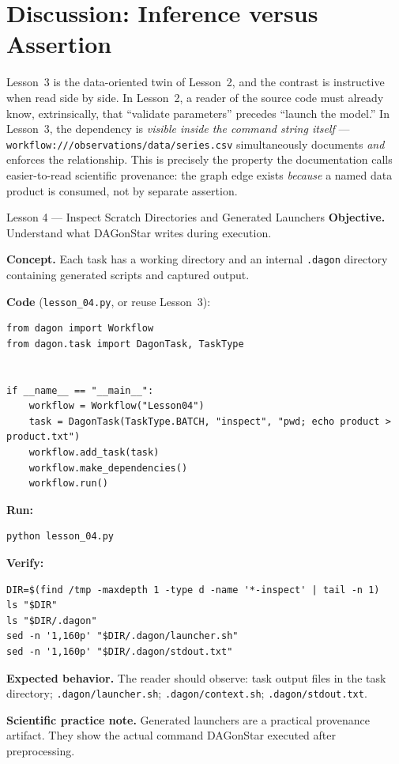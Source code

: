 \section{Discussion: Inference versus Assertion}

Lesson~3 is the data-oriented twin of Lesson~2, and the contrast is
instructive when read side by side. In Lesson~2, a reader of the source code
must already know, extrinsically, that ``validate parameters'' precedes
``launch the model.'' In Lesson~3, the dependency is \emph{visible inside the
command string itself} --- \texttt{workflow:///observations/data/series.csv}
simultaneously documents \emph{and} enforces the relationship. This is
precisely the property the documentation calls easier-to-read scientific
provenance: the graph edge exists \emph{because} a named data product is
consumed, not by separate assertion.

\begin{lessonbox}{Lesson 4 --- Inspect Scratch Directories and Generated Launchers}
\textbf{Objective.} Understand what DAGonStar writes during execution.

\textbf{Concept.} Each task has a working directory and an internal
\texttt{.dagon} directory containing generated scripts and captured output.

\textbf{Code} (\texttt{lesson\_04.py}, or reuse Lesson~3):
\begin{lstlisting}
from dagon import Workflow
from dagon.task import DagonTask, TaskType


if __name__ == "__main__":
    workflow = Workflow("Lesson04")
    task = DagonTask(TaskType.BATCH, "inspect", "pwd; echo product > product.txt")
    workflow.add_task(task)
    workflow.make_dependencies()
    workflow.run()
\end{lstlisting}

\textbf{Run:}
\begin{lstlisting}[style=bash]
python lesson_04.py
\end{lstlisting}

\textbf{Verify:}
\begin{lstlisting}[style=bash]
DIR=$(find /tmp -maxdepth 1 -type d -name '*-inspect' | tail -n 1)
ls "$DIR"
ls "$DIR/.dagon"
sed -n '1,160p' "$DIR/.dagon/launcher.sh"
sed -n '1,160p' "$DIR/.dagon/stdout.txt"
\end{lstlisting}

\textbf{Expected behavior.} The reader should observe: task output files in
the task directory; \texttt{.dagon/launcher.sh}; \texttt{.dagon/context.sh};
\texttt{.dagon/stdout.txt}.

\textbf{Scientific practice note.} Generated launchers are a practical
provenance artifact. They show the actual command DAGonStar executed after
preprocessing.
\end{lessonbox}

